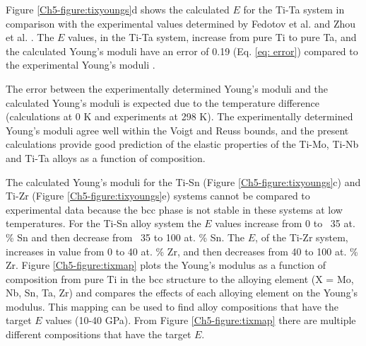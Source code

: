 Figure \ref{Ch5-figure:tixyoungs}d shows the calculated $E$ for the Ti-Ta system in comparison with the experimental values determined by Fedotov et al. \cite{Fedotov1985} and Zhou et al. \cite{Zhou2004a,Zhou2009a}. The $E$ values, in the Ti-Ta system, increase from pure Ti to pure Ta, and the calculated Young's moduli have an error of 0.19 (Eq. \ref{eq: error}) compared to the experimental Young's moduli \cite{Fedotov1985,Zhou2004a,Zhou2009a}.  

The error between the experimentally determined Young's moduli and the calculated Young's moduli is expected due to the temperature difference (calculations at 0 K and experiments at 298 K). The experimentally determined Young's moduli agree well within the Voigt and Reuss bounds, and the present calculations provide good prediction of the elastic properties of the Ti-Mo, Ti-Nb and Ti-Ta alloys as a function of composition.

The calculated Young's moduli for the Ti-Sn (Figure \ref{Ch5-figure:tixyoungs}c) and Ti-Zr (Figure \ref{Ch5-figure:tixyoungs}e) systems cannot be compared to experimental data because the bcc phase is not stable in these systems at low temperatures. For the Ti-Sn alloy system the $E$ values increase from 0 to ~35 at. \% Sn and then decrease from ~35 to 100 at. \% Sn. The $E$, of the Ti-Zr system, increases in value from 0 to 40 at. \% Zr, and then decreases from 40 to 100 at. \% Zr. Figure \ref{Ch5-figure:tixmap} plots the Young's modulus as a function of composition from pure Ti in the bcc structure to the alloying element (X = Mo, Nb, Sn, Ta, Zr) and compares the effects of each alloying element on the Young's modulus. This mapping can be used to find alloy compositions that have the target $E$ values (10-40 GPa). From Figure \ref{Ch5-figure:tixmap}  there are multiple different compositions that have the target $E$.

